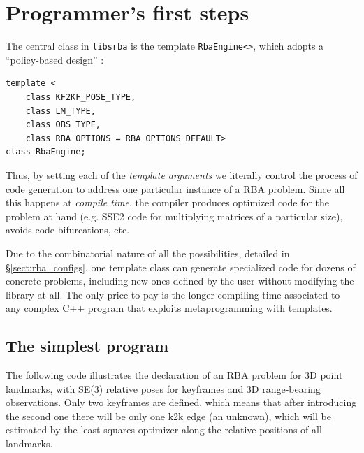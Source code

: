 \documentclass[a4paper,11pt]{article}
\begin{document}
\newpage


\section{Programmer's first steps}
\label{sect:program_first}

The central class in \texttt{libsrba} is the template \texttt{RbaEngine<>}, which 
adopts a ``policy-based design'' \cite{andrei2001modern}:

\begin{lstlisting}
template <
	class KF2KF_POSE_TYPE,
	class LM_TYPE,
	class OBS_TYPE, 
	class RBA_OPTIONS = RBA_OPTIONS_DEFAULT>
class RbaEngine;
\end{lstlisting}

Thus, by setting each of the \emph{template arguments} we literally control the process 
of code generation to address one particular instance of a RBA problem. 
Since all this happens at \emph{compile time}, the compiler produces optimized code for 
the problem at hand (e.g. SSE2 code for multiplying matrices of a particular size), 
avoids code bifurcations, etc.

Due to the combinatorial nature of all the possibilities, 
detailed in \S\ref{sect:rba_configs}, one template class 
can generate specialized code for dozens of concrete problems, 
including new ones defined by the user without modifying the library at all.
The only price to pay is the longer compiling time associated to any complex C++ program 
that exploits metaprogramming with templates.


\subsection{The simplest program}

The following code illustrates the declaration of an RBA problem for 3D point landmarks, 
with SE(3) relative poses for keyframes and 3D range-bearing observations. 
Only two keyframes are defined, which means that after introducing the second one
there will be only one k2k edge (an unknown), which will be estimated by the least-squares 
optimizer along the relative positions of all landmarks.
\end{document}
